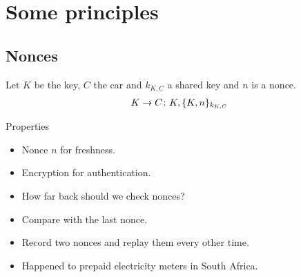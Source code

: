 \mode*




\section{Some principles}

\subsection{Nonces}

\begin{frame}
  \begin{example}
    Let \(K\) be the key, \(C\) the car and \(k_{K, C}\) a shared key and \(n\) 
    is a nonce.
    \begin{align*}
      K\to C\colon K, \{K, n\}_{k_{K, C}}
    \end{align*}
  \end{example}

  \pause

  \begin{block}{Properties}
    \begin{itemize}
      \item Nonce \(n\) for freshness.
      \item Encryption for authentication.
    \end{itemize}
  \end{block}
\end{frame}

\begin{frame}
  \begin{question}
    \begin{itemize}
      \item How far back should we check nonces?
    \end{itemize}
  \end{question}

  \begin{example}
    \begin{itemize}
      \item Compare with the last nonce.
      \item Record two nonces and replay them every other time.
      \item Happened to prepaid electricity meters in South Africa.
    \end{itemize}
  \end{example}
\end{frame}


